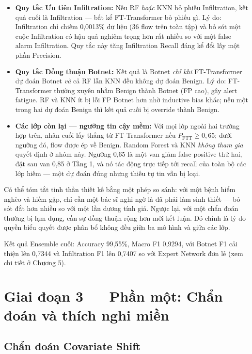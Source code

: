 \documentclass[../DoAn.tex]{subfiles}
\begin{document}
\begin{itemize}
    \item \textbf{Quy tắc Ưu tiên Infiltration:} Nếu RF \textit{hoặc} KNN bỏ phiếu Infiltration, kết quả cuối là Infiltration --- bất kể FT-Transformer bỏ phiếu gì. Lý do: Infiltration chỉ chiếm 0,0013\% dữ liệu (36 flow trên toàn tập) và bỏ sót một cuộc Infiltration có hậu quả nghiêm trọng hơn rất nhiều so với một false alarm Infiltration. Quy tắc này tăng Infiltration Recall đáng kể đổi lấy một phần Precision.

    \item \textbf{Quy tắc Đồng thuận Botnet:} Kết quả là Botnet \textit{chỉ khi} FT-Transformer dự đoán Botnet \textit{và} cả RF lẫn KNN đều không dự đoán Benign. Lý do: FT-Transformer thường xuyên nhầm Benign thành Botnet (FP cao), gây alert fatigue. RF và KNN ít bị lỗi FP Botnet hơn nhờ inductive bias khác; nếu một trong hai dự đoán Benign thì kết quả cuối bị override thành Benign.
    \item \textbf{Các lớp còn lại --- ngưỡng tin cậy mềm:} Với mọi lớp ngoài hai trường hợp trên, nhãn cuối lấy thẳng từ FT-Transformer nếu $P_\text{FTT} \geq 0{,}65$; dưới ngưỡng đó, flow được ép về Benign. Random Forest và KNN \textit{không tham gia} quyết định ở nhóm này. Ngưỡng 0,65 là một van giảm false positive thứ hai, đặt sau van 0,85 ở Tầng 1, và nó tác động trực tiếp tới recall của toàn bộ các lớp hiếm --- một dự đoán đúng nhưng thiếu tự tin vẫn bị loại.
\end{itemize}

Có thể tóm tắt tinh thần thiết kế bằng một phép so sánh: với một bệnh hiểm nghèo và hiếm gặp, chỉ cần một bác sĩ nghi ngờ là đã phải làm sinh thiết --- bỏ sót đắt hơn nhiều so với một lần dương tính giả. Ngược lại, với một chẩn đoán thường bị lạm dụng, cần sự đồng thuận rộng hơn mới kết luận. Đó chính là lý do quyền biểu quyết được phân bổ không đều giữa ba mô hình và giữa các lớp.

Kết quả Ensemble cuối: Accuracy 99,55\%, Macro F1 0,9294, với Botnet F1 cải thiện lên 0,7344 và Infiltration F1 lên 0,7407 so với Expert Network đơn lẻ (xem chi tiết ở Chương 5).

\section{Giai đoạn 3 --- Phần một: Chẩn đoán và thích nghi miền}
\label{sec:gd3}

\subsection{Chẩn đoán Covariate Shift}
\label{subsec:gd3-covshift}
\end{document}
